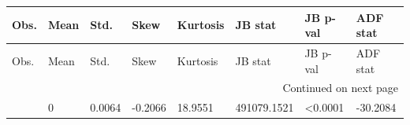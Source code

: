 \begingroup
\footnotesize
\setlength{\tabcolsep}{3pt}
\begin{longtable}{@{}llllllll@{}}
\toprule
Obs. & Mean & Std. & Skew & Kurtosis & JB stat & JB p-val & ADF stat \\
\midrule
\endfirsthead
\toprule
Obs. & Mean & Std. & Skew & Kurtosis & JB stat & JB p-val & ADF stat \\
\midrule
\endhead
\midrule
\multicolumn{8}{r}{Continued on next page} \\
\midrule
\endfoot
\bottomrule
\endlastfoot
46278 & 0 & 0.0064 & -0.2066 & 18.9551 & 491079.1521 & <0.0001 & -30.2084 \\
\end{longtable}
\endgroup
